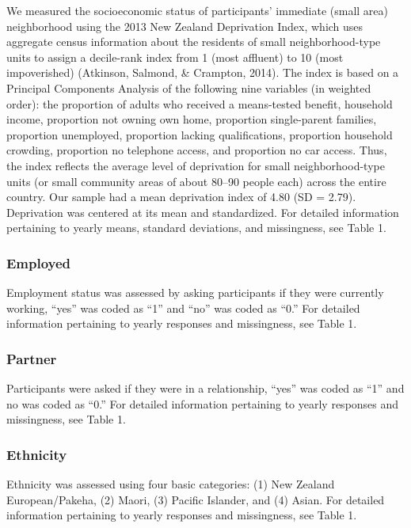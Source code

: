\documentclass[
  english,
  man,floatsintext]{apa6}
\begin{document}
We measured the socioeconomic status of participants' immediate (small area) neighborhood using the 2013 New Zealand Deprivation Index, which uses aggregate census information about the residents of small neighborhood-type units to assign a decile-rank index from 1 (most affluent) to 10 (most impoverished) (Atkinson, Salmond, \& Crampton, 2014). The index is based on a Principal Components Analysis of the following nine variables (in weighted order): the proportion of adults who received a means-tested benefit, household income, proportion not owning own home, proportion single-parent families, proportion unemployed, proportion lacking qualifications, proportion household crowding, proportion no telephone access, and proportion no car access. Thus, the index reflects the average level of deprivation for small neighborhood-type units (or small community areas of about 80--90 people each) across the entire country. Our sample had a mean deprivation index of 4.80 (SD = 2.79). Deprivation was centered at its mean and standardized. For detailed information pertaining to yearly means, standard deviations, and missingness, see Table 1.

\hypertarget{employed}{%
\subsubsection{Employed}\label{employed}}

Employment status was assessed by asking participants if they were currently working, ``yes'' was coded as ``1'' and ``no'' was coded as ``0.'' For detailed information pertaining to yearly responses and missingness, see Table 1.

\hypertarget{partner}{%
\subsubsection{Partner}\label{partner}}

Participants were asked if they were in a relationship, ``yes'' was coded as ``1'' and no was coded as ``0.'' For detailed information pertaining to yearly responses and missingness, see Table 1.

\hypertarget{ethnicity}{%
\subsubsection{Ethnicity}\label{ethnicity}}

Ethnicity was assessed using four basic categories: (1) New Zealand European/Pakeha, (2) Maori, (3) Pacific Islander, and (4) Asian. For detailed information pertaining to yearly responses and missingness, see Table 1.
\end{document}
